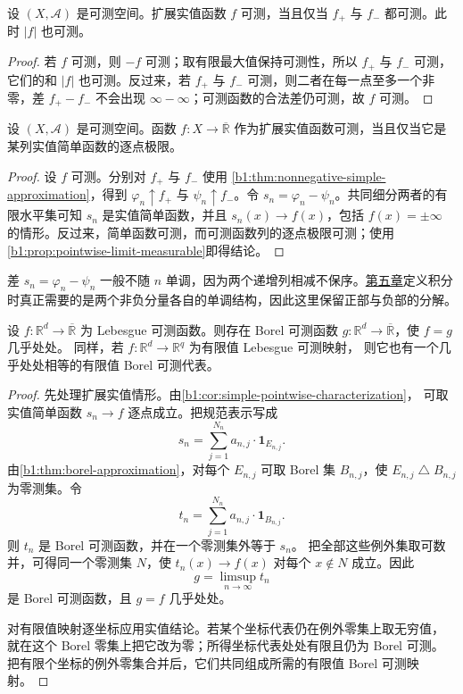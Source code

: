 \begin{proposition}
\label{b1:prop:positive-negative-measurable}
设 \((X,\mathcal A)\) 是可测空间。扩展实值函数 \(f\) 可测，当且仅当 \(f_+\) 与 \(f_-\) 都可测。此时 \(|f|\) 也可测。
\end{proposition}
\begin{proof}
若 \(f\) 可测，则 \(-f\) 可测；取有限最大值保持可测性，所以 \(f_+\) 与 \(f_-\) 可测，它们的和 \(|f|\) 也可测。反过来，若 \(f_+\) 与 \(f_-\) 可测，则二者在每一点至多一个非零，差 \(f_+-f_-\) 不会出现 \(\infty-\infty\)；可测函数的合法差仍可测，故 \(f\) 可测。
\end{proof}

\begin{corollary}
\label{b1:cor:simple-pointwise-characterization}
设 \((X,\mathcal A)\) 是可测空间。函数 \(f:X\to\overline{\mathbb R}\) 作为扩展实值函数可测，当且仅当它是某列实值简单函数的逐点极限。
\end{corollary}
\begin{proof}
设 \(f\) 可测。分别对 \(f_+\) 与 \(f_-\) 使用%
\cref{b1:thm:nonnegative-simple-approximation}，得到
\(\varphi_n\uparrow f_+\) 与 \(\psi_n\uparrow f_-\)。令
\(s_n=\varphi_n-\psi_n\)。共同细分两者的有限水平集可知 \(s_n\) 是实值简单函数，并且 \(s_n(x)\to f(x)\)，包括 \(f(x)=\pm\infty\) 的情形。反过来，简单函数可测，而可测函数列的逐点极限可测；使用\cref{b1:prop:pointwise-limit-measurable}即得结论。
\end{proof}

差 \(s_n=\varphi_n-\psi_n\) 一般不随 \(n\) 单调，因为两个递增列相减不保序。\hyperref[b1:ch:05]{第五章}定义积分时真正需要的是两个非负分量各自的单调结构，因此这里保留正部与负部的分解。

\begin{theorem}[Borel 代表]
\label{b1:thm:lebesgue-borel-representative}
设 \(f:\mathbb R^d\to\overline{\mathbb R}\) 为 Lebesgue 可测函数。则存在 Borel 可测函数
\(g:\mathbb R^d\to\overline{\mathbb R}\)，使 \(f=g\) 几乎处处。
同样，若 \(f:\mathbb R^d\to\mathbb R^q\) 为有限值 Lebesgue 可测映射，
则它也有一个几乎处处相等的有限值 Borel 可测代表。
\end{theorem}
\begin{proof}
先处理扩展实值情形。由\cref{b1:cor:simple-pointwise-characterization}，
可取实值简单函数 \(s_n\to f\) 逐点成立。把规范表示写成
\[
 s_n=\sum_{j=1}^{N_n}a_{n,j}\cdot\mathbf1_{E_{n,j}}.
\]
由\cref{b1:thm:borel-approximation}，对每个 \(E_{n,j}\) 可取 Borel 集
\(B_{n,j}\)，使 \(E_{n,j}\mathbin{\triangle}B_{n,j}\) 为零测集。令
\[
 t_n=\sum_{j=1}^{N_n}a_{n,j}\cdot\mathbf1_{B_{n,j}}.
\]
则 \(t_n\) 是 Borel 可测函数，并在一个零测集外等于 \(s_n\)。
把全部这些例外集取可数并，可得同一个零测集 \(N\)，使
\(t_n(x)\to f(x)\) 对每个 \(x\notin N\) 成立。因此
\[
 g=\limsup_{n\to\infty}t_n
\]
是 Borel 可测函数，且 \(g=f\) 几乎处处。

对有限值映射逐坐标应用实值结论。若某个坐标代表仍在例外零集上取无穷值，
就在这个 Borel 零集上把它改为零；所得坐标代表处处有限且仍为 Borel 可测。
把有限个坐标的例外零集合并后，它们共同组成所需的有限值 Borel 可测映射。
\end{proof}

